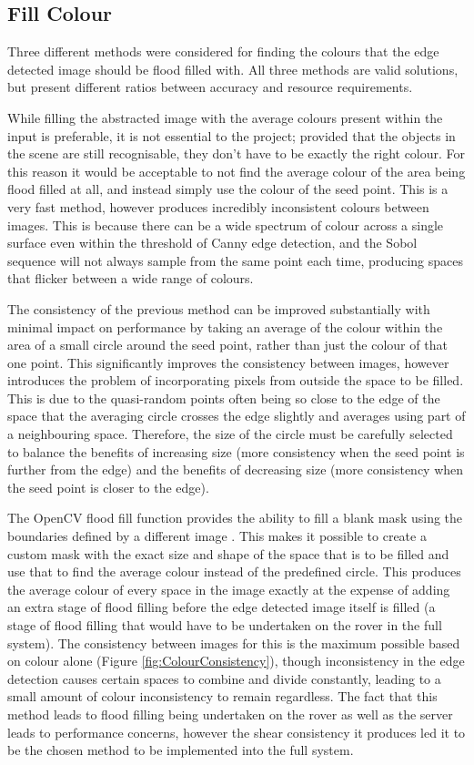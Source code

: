 \subsection{Fill Colour}

Three different methods were considered for finding the colours that the edge detected image should be flood filled with. All three methods are valid solutions, but present different ratios between accuracy and resource requirements.

While filling the abstracted image with the average colours present within the input is preferable, it is not essential to the project; provided that the objects in the scene are still recognisable, they don't have to be exactly the right colour. For this reason it would be acceptable to not find the average colour of the area being flood filled at all, and instead simply use the colour of the seed point. This is a very fast method, however produces incredibly inconsistent colours between images. This is because there can be a wide spectrum of colour across a single surface even within the threshold of Canny edge detection, and the Sobol sequence will not always sample from the same point each time, producing spaces that flicker between a wide range of colours.

The consistency of the previous method can be improved substantially with minimal impact on performance by taking an average of the colour within the area of a small circle around the seed point, rather than just the colour of that one point. This significantly improves the consistency between images, however introduces the problem of incorporating pixels from outside the space to be filled. This is due to the quasi-random points often being so close to the edge of the space that the averaging circle crosses the edge slightly and averages using part of a neighbouring space. Therefore, the size of the circle must be carefully selected to balance the benefits of increasing size (more consistency when the seed point is further from the edge) and the benefits of decreasing size (more consistency when the seed point is closer to the edge). 

The OpenCV flood fill function provides the ability to fill a blank mask using the boundaries defined by a different image \cite{bradski2008learning}. This makes it possible to create a custom mask with the exact size and shape of the space that is to be filled and use that to find the average colour instead of the predefined circle. This produces the average colour of every space in the image exactly at the expense of adding an extra stage of flood filling before the edge detected image itself is filled (a stage of flood filling that would have to be undertaken on the rover in the full system). The consistency between images for this is the maximum possible based on colour alone (Figure \ref{fig:ColourConsistency}), though inconsistency in the edge detection causes certain spaces to combine and divide constantly, leading to a small amount of colour inconsistency to remain regardless. The fact that this method leads to flood filling being undertaken on the rover as well as the server leads to performance concerns, however the shear consistency it produces led it to be the chosen method to be implemented into the full system.

